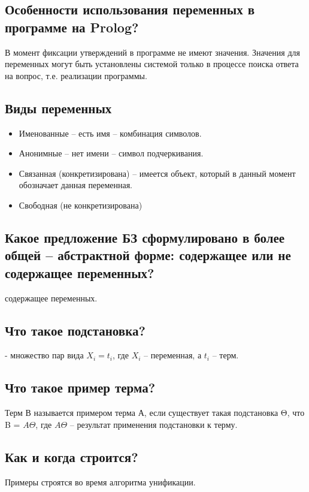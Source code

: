 \documentclass[12pt,a4paper,oneside]{report}
\begin{document}
\subsection*{Особенности использования переменных в программе на Prolog?}
\quad В момент фиксации утверждений в программе не имеют значения. Значения для переменных могут быть установлены системой только в процессе поиска ответа на вопрос, т.е. реализации программы.
\subsection*{Виды переменных}
\begin{itemize}
    \item Именованные – есть имя – комбинация символов.
    \item Анонимные – нет имени – символ подчеркивания.
    \item Связанная (конкретизирована) – имеется объект, который в данный момент обозначает данная переменная.
    \item Свободная (не конкретизирована)
\end{itemize}

\subsection*{Какое предложение БЗ сформулировано в более общей – абстрактной форме: содержащее или не содержащее переменных?}
 содержащее переменных.
\subsection*{Что такое подстановка?}
 - множество пар вида ${X_i = t_i}$, где $X_i$ – переменная, а $t_i$ – терм.
\subsection*{Что такое пример терма?}
\quad Терм В называется примером терма А, если существует такая подстановка Θ, что B = $A\Theta$, где $A\Theta$ – результат применения подстановки к терму. 
\subsection*{Как и когда строится?}
\quad Примеры строятся во время алгоритма унификации.
\end{document}
